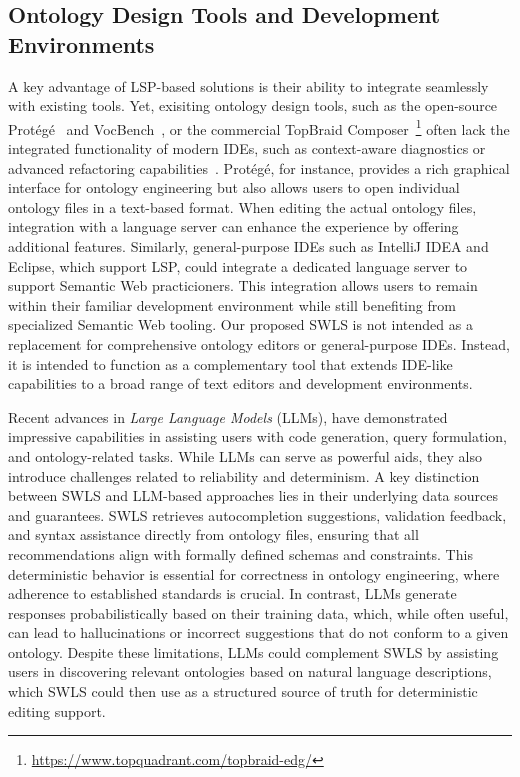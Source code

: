 \subsection{Ontology Design Tools and Development Environments}

A key advantage of LSP-based solutions is their ability to integrate seamlessly with existing tools.
Yet, exisiting ontology design tools, such as the open-source Protégé~\cite{protege2015} and VocBench~\cite{Vocbench}, or the commercial TopBraid Composer~\footnote{\url{https://www.topquadrant.com/topbraid-edg/}}
often lack the integrated functionality of modern IDEs, such as context-aware diagnostics or advanced refactoring capabilities~\cite{ComparingOntologyBuildingTools}.
Protégé, for instance, provides a rich graphical interface for ontology engineering but also allows users to open individual ontology files in a text-based format.
When editing the actual ontology files, integration with a language server can enhance the experience by offering additional features. 
Similarly, general-purpose IDEs such as IntelliJ IDEA and Eclipse, which support LSP, could integrate a dedicated language server to support Semantic Web practicioners. 
This integration allows users to remain within their familiar development environment while still benefiting from specialized Semantic Web tooling.
Our proposed SWLS is not intended as a replacement for comprehensive ontology editors or general-purpose IDEs.
Instead, it is intended to function as a complementary tool that extends IDE-like capabilities to a broad range of text editors and development environments.

Recent advances in \textit{Large Language Models} (LLMs), have demonstrated impressive capabilities in assisting users with code generation, query formulation, and ontology-related tasks\cite{Chad}. 
While LLMs can serve as powerful aids, they also introduce challenges related to reliability and determinism.
A key distinction between SWLS and LLM-based approaches lies in their underlying data sources and guarantees.
SWLS retrieves autocompletion suggestions, validation feedback, and syntax assistance directly from ontology files, ensuring that all recommendations align with formally defined schemas and constraints.
This deterministic behavior is essential for correctness in ontology engineering, where adherence to established standards is crucial. 
In contrast, LLMs generate responses probabilistically based on their training data, which, while often useful, can lead to hallucinations or incorrect suggestions that do not conform to a given ontology.
Despite these limitations, LLMs could complement SWLS by assisting users in discovering relevant ontologies based on natural language descriptions, which SWLS could then use as a structured source of truth for deterministic editing support.

  

